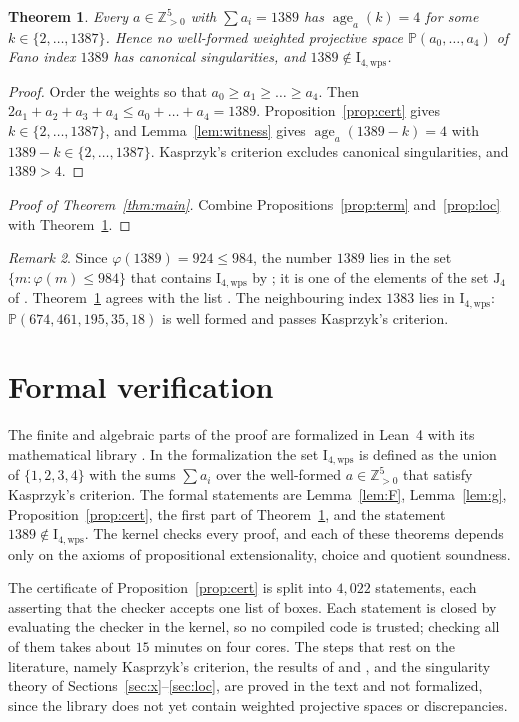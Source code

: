 \documentclass{amsart}
\newtheorem{theorem}{Theorem}[section]
\theoremstyle{remark}
\newtheorem{remark}[theorem]{Remark}
\DeclareMathOperator{\age}{age}
\newcommand{\Iw}{\mathrm{I}_{4,\mathrm{wps}}}
\newcommand{\Z}{\mathbb{Z}}
\newcommand{\PP}{\mathbb{P}}
\begin{document}
\begin{theorem}\label{thm:wps}
Every $a\in\Z_{>0}^5$ with $\sum a_i=1389$ has $\age_a(k)=4$ for some $k\in\{2,\dots,1387\}$. Hence no well-formed weighted projective space $\PP(a_0,\dots,a_4)$ of Fano index $1389$ has canonical singularities, and $1389\notin\Iw$.
\end{theorem}

\begin{proof}
Order the weights so that $a_0\geq a_1\geq\dots\geq a_4$. Then $2a_1+a_2+a_3+a_4\leq a_0+\dots+a_4=1389$. Proposition~\ref{prop:cert} gives $k\in\{2,\dots,1387\}$, and Lemma~\ref{lem:witness} gives $\age_a(1389-k)=4$ with $1389-k\in\{2,\dots,1387\}$. Kasprzyk's criterion excludes canonical singularities, and $1389>4$.
\end{proof}

\begin{proof}[Proof of Theorem~\textup{\ref{thm:main}}]
Combine Propositions~\ref{prop:term} and~\ref{prop:loc} with Theorem~\ref{thm:wps}.
\end{proof}

\begin{remark}
Since $\varphi(1389)=924\leq984$, the number $1389$ lies in the set $\{m:\varphi(m)\leq984\}$ that contains $\Iw$ by \cite[Theorem~4.4]{Liu}; it is one of the elements of the set $\mathrm J_4$ of \cite[Section~4]{Liu}. Theorem~\ref{thm:wps} agrees with the list \cite{LiuData}. The neighbouring index $1383$ lies in $\Iw$: $\PP(674,461,195,35,18)$ is well formed and passes Kasprzyk's criterion.
\end{remark}

\section{Formal verification}\label{sec:lean}

The finite and algebraic parts of the proof are formalized in Lean~4 with its mathematical library \cite{Lean,Mathlib}. In the formalization the set $\Iw$ is defined as the union of $\{1,2,3,4\}$ with the sums $\sum a_i$ over the well-formed $a\in\Z_{>0}^5$ that satisfy Kasprzyk's criterion. The formal statements are Lemma~\ref{lem:F}, Lemma~\ref{lem:g}, Proposition~\ref{prop:cert}, the first part of Theorem~\ref{thm:wps}, and the statement $1389\notin\Iw$. The kernel checks every proof, and each of these theorems depends only on the axioms of propositional extensionality, choice and quotient soundness.

The certificate of Proposition~\ref{prop:cert} is split into $4{,}022$ statements, each asserting that the checker accepts one list of boxes. Each statement is closed by evaluating the checker in the kernel, so no compiled code is trusted; checking all of them takes about $15$ minutes on four cores. The steps that rest on the literature, namely Kasprzyk's criterion, the results of \cite{IF} and \cite{ETW}, and the singularity theory of Sections~\ref{sec:x}--\ref{sec:loc}, are proved in the text and not formalized, since the library does not yet contain weighted projective spaces or discrepancies.
\end{document}
